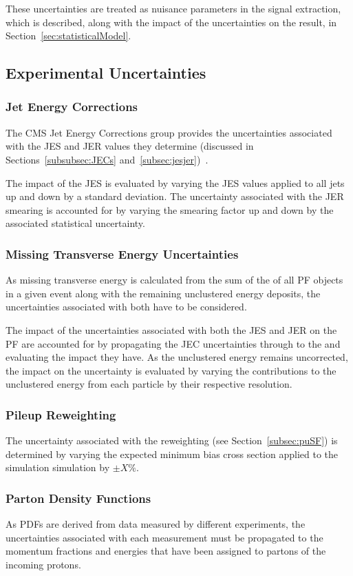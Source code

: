 These uncertainties are treated as nuisance parameters in the signal extraction, which is described, along with the impact of the uncertainties on the result, in Section~\ref{sec:statisticalModel}.

\subsection{Experimental Uncertainties}
\subsubsection*{Jet Energy Corrections}
The CMS Jet Energy Corrections group provides the uncertainties associated with the JES and JER values they determine (discussed in Sections~\ref{subsubsec:JECs} and~\ref{subsec:jesjer})~\cite{Khachatryan:2016kdb}. 

The impact of the JES is evaluated by varying the JES values applied to all jets up and down by a standard deviation.
The uncertainty associated with the JER smearing is accounted for by varying the smearing factor up and down by the associated statistical uncertainty.

\subsubsection*{Missing Transverse Energy Uncertainties}
As missing transverse energy is calculated from the sum of the \pT of all PF objects in a given event along with the remaining unclustered energy deposits, the uncertainties associated with both have to be considered.

The impact of the uncertainties associated with both the JES and JER on the PF \MET are accounted for by propagating the JEC uncertainties through to the \MET and evaluating the impact they have.
As the unclustered energy remains uncorrected, the impact on the \MET uncertainty is evaluated by varying the contributions to the unclustered energy from each particle by their respective resolution.

\subsubsection*{Pileup Reweighting}
The uncertainty associated with the \PU reweighting (see Section~\ref{subsec:puSF}) is determined by varying the expected minimum bias cross section applied to the simulation simulation by $\pm X\%$.

\subsubsection*{Parton Density Functions}\label{subsec:pdfSysts}
As PDFs are derived from data measured by different experiments, the uncertainties associated with each measurement must be propagated to the momentum fractions and energies that have been assigned to partons of the incoming protons.

